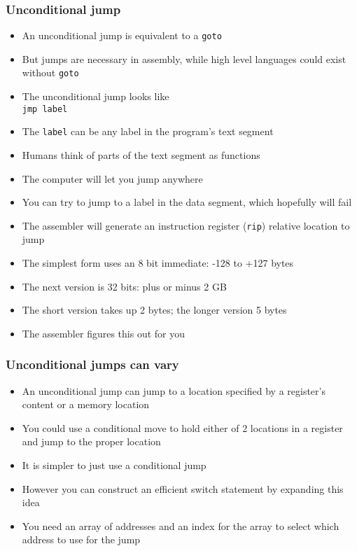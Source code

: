 \documentclass{beamer}
\begin{document}
\begin{frame}[fragile]
    \frametitle{Unconditional jump}
    \begin{itemize}
        \item An unconditional jump is equivalent to a {\tt goto}
        \item But jumps are necessary in assembly, while high level
              languages could exist without {\tt goto}
        \item The unconditional jump looks like\\
    {\tt jmp     label}
        \item The {\tt label} can be any label in the program's text segment
        \item Humans think of parts of the text segment as functions
        \item The computer will let you jump anywhere
        \item You can try to jump to a label in the data segment, which
              hopefully will fail
        \item The assembler will generate an instruction register ({\tt rip})
              relative location to jump
        \item The simplest form uses an 8 bit immediate: -128 to +127 bytes
        \item The next version is 32 bits: plus or minus 2 GB
        \item The short version takes up 2 bytes; the longer version 5 bytes
        \item The assembler figures this out for you
    \end{itemize}
\end{frame}

\begin{frame}
    \frametitle{Unconditional jumps can vary}
    \begin{itemize}
        \item An unconditional jump can jump to a location specified
              by a register's content or a memory location
        \item You could use a conditional move to hold either of 2 locations
              in a register and jump to the proper location
        \item It is simpler to just use a conditional jump
        \item However you can construct an efficient switch statement
              by expanding this idea
        \item You need an array of addresses and an index for the array
              to select which address to use for the jump
    \end{itemize}
\end{frame}
\end{document}
